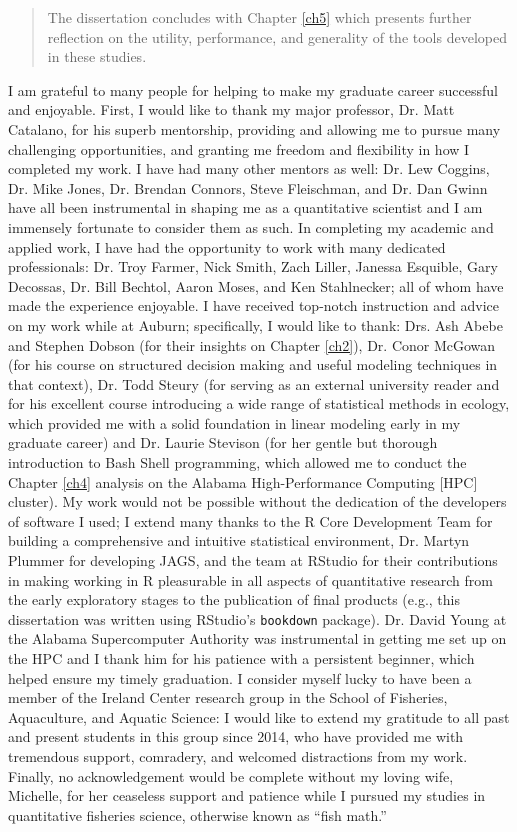 \begin{romanpages}
\begin{abstract}
The dissertation concludes with Chapter \ref{ch5} which presents further reflection on the utility, performance, and generality of the tools developed in these studies.

\end{abstract}

\begin{acknowledgments}
\noindent
I am grateful to many people for helping to make my graduate career successful and enjoyable. First, I would like to thank my major professor, Dr. Matt Catalano, for his superb mentorship, providing and allowing me to pursue many challenging opportunities, and granting me freedom and flexibility in how I completed my work. I have had many other mentors as well: Dr. Lew Coggins, Dr. Mike Jones, Dr. Brendan Connors, Steve Fleischman, and Dr. Dan Gwinn have all been instrumental in shaping me as a quantitative scientist and I am immensely fortunate to consider them as such. In completing my academic and applied work, I have had the opportunity to work with many dedicated professionals: Dr. Troy Farmer, Nick Smith, Zach Liller, Janessa Esquible, Gary Decossas, Dr. Bill Bechtol, Aaron Moses, and Ken Stahlnecker; all of whom have made the experience enjoyable. I have received top-notch instruction and advice on my work while at Auburn; specifically, I would like to thank: Drs. Ash Abebe and Stephen Dobson (for their insights on Chapter \ref{ch2}), Dr. Conor McGowan (for his course on structured decision making and useful modeling techniques in that context), Dr. Todd Steury (for serving as an external university reader and for his excellent course introducing a wide range of statistical methods in ecology, which provided me with a solid foundation in linear modeling early in my graduate career) and Dr. Laurie Stevison (for her gentle but thorough introduction to Bash Shell programming, which allowed me to conduct the Chapter \ref{ch4} analysis on the Alabama High-Performance Computing [HPC] cluster). My work would not be possible without the dedication of the developers of software I used; I extend many thanks to the R Core Development Team for building a comprehensive and intuitive statistical environment, Dr. Martyn Plummer for developing JAGS, and the team at RStudio for their contributions in making working in R pleasurable in all aspects of quantitative research from the early exploratory stages to the publication of final products (e.g., this dissertation was written using RStudio’s \texttt{bookdown} package). Dr. David Young at the Alabama Supercomputer Authority was instrumental in getting me set up on the HPC and I thank him for his patience with a persistent beginner, which helped ensure my timely graduation. I consider myself lucky to have been a member of the Ireland Center research group in the School of Fisheries, Aquaculture, and Aquatic Science: I would like to extend my gratitude to all past and present students in this group since 2014, who have provided me with tremendous support, comradery, and welcomed distractions from my work. Finally, no acknowledgement would be complete without my loving wife, Michelle, for her ceaseless support and patience while I pursued my studies in quantitative fisheries science, otherwise known as ``fish math.''

\end{acknowledgments}
\end{romanpages}
